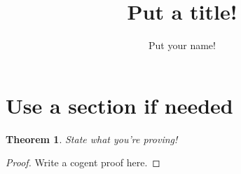 \documentclass{article}
\title{Put a title!}
\author{Put your name!}
\newtheorem{theorem}{Theorem}
\begin{document}
\maketitle

\section*{Use a section if needed}
\begin{theorem}
State what you're proving!
\end{theorem}

\begin{proof}
Write a cogent proof here.
\end{proof}
\end{document}
